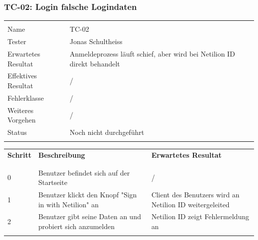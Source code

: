 \subsubsection{TC-02: Login falsche Logindaten}
\begin{table}[H]
  \begin{tabularx}{\textwidth}{l X}\hline \\
  Name & TC-02 \\
  Tester & Jonas Schultheiss \\
  Erwartetes Resultat & Anmeldeprozess läuft schief, aber wird bei Netilion ID direkt behandelt \\
  Effektives Resultat & / \\
  Fehlerklasse & / \\
  Weiteres Vorgehen & / \\
  Status & Noch nicht durchgeführt \\
  \\\hline
  \end{tabularx}
\end{table}
\begin{table}[H]
  \begin{tabularx}{\textwidth}{l X X}
  \textbf{Schritt} & \textbf{Beschreibung} & \textbf{Erwartetes Resultat}\\ \\\hline \\
  0 & Benutzer befindet sich auf der Startseite & / \\
  1 & Benutzer klickt den Knopf "Sign in with Netilion" an & Client des Benutzers wird an Netilion ID weitergeleited \\
  2 & Benutzer gibt seine Daten an und probiert sich anzumelden & Netilion ID zeigt Fehlermeldung an \\
  \\\hline
  \end{tabularx}
\end{table}
\pagebreak
